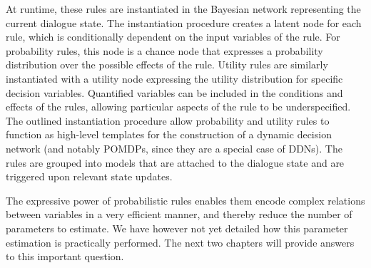 At runtime, these rules are instantiated in the Bayesian network representing the current dialogue state. The instantiation procedure creates a latent node for each rule, which is conditionally dependent on the input variables of the rule.  For probability rules, this node is a chance node that expresses a probability distribution over the possible effects of the rule. Utility rules are similarly instantiated with a utility node expressing the utility distribution for specific decision variables.  Quantified variables can be included in the conditions and effects of the rules, allowing particular aspects of the rule to be underspecified.  The outlined instantiation procedure allow probability and utility rules to function as high-level templates for the construction of a dynamic decision network (and notably POMDPs, since they are a special case of DDNs). The rules are grouped into models that are attached to the dialogue state and are triggered upon relevant state updates. 

The expressive power of probabilistic rules enables them encode complex relations between variables in a very efficient manner, and thereby reduce the number of parameters to estimate.  We have however not yet detailed how this parameter estimation is practically performed. The next two chapters will provide answers to this important question. 
